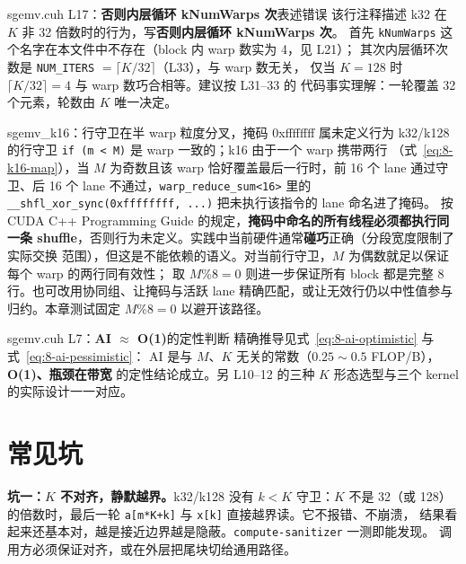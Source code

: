 \begin{kaogu}[F3]{sgemv.cuh L17：\textbf{否则内层循环 kNumWarps 次}表述错误}
  该行注释描述 k32 在 $K$ 非 32 倍数时的行为，写\textbf{否则内层循环 kNumWarps 次}。
  首先 \texttt{kNumWarps} 这个名字在本文件中不存在（block 内 warp 数实为 4，见 L21）；
  其次内层循环次数是 \texttt{NUM\_ITERS} $= \lceil K/32 \rceil$（L33），与 warp 数无关，
  仅当 $K = 128$ 时 $\lceil K/32 \rceil = 4$ 与 warp 数巧合相等。建议按 L31--33 的
  代码事实理解：一轮覆盖 32 个元素，轮数由 $K$ 唯一决定。
\end{kaogu}

\begin{kaogu}[F2]{sgemv\_k16：行守卫在半 warp 粒度分叉，掩码 0xffffffff 属未定义行为}
  k32/k128 的行守卫 \texttt{if (m < M)} 是 warp 一致的；k16 由于一个 warp 携带两行
  （式~\ref{eq:8-k16-map}），当 $M$ 为奇数且该 warp 恰好覆盖最后一行时，前 16 个 lane
  通过守卫、后 16 个 lane 不通过，\texttt{warp\_\allowbreak{}reduce\_\allowbreak{}sum\allowbreak{}<16>} 里的
  \texttt{\_\allowbreak{}\_\allowbreak{}shfl\_\allowbreak{}xor\_\allowbreak{}sync\allowbreak{}(0xffffffff,\allowbreak{} .\allowbreak{}.\allowbreak{}.\allowbreak{})} 把未执行该指令的 lane 命名进了掩码。
  按 CUDA C++ Programming Guide 的规定，\textbf{掩码中命名的所有线程必须都执行同一条
  shuffle}，否则行为未定义。实践中当前硬件通常\textbf{碰巧}正确（分段宽度限制了实际交换
  范围），但这是不能依赖的语义。对当前行守卫，$M$ 为偶数就足以保证每个 warp 的两行同有效性；
  取 $M \% 8 = 0$ 则进一步保证所有 block 都是完整 8 行。也可改用协同组、让掩码与活跃 lane
  精确匹配，或让无效行仍以中性值参与归约。本章测试固定 $M \% 8 = 0$ 以避开该路径。
\end{kaogu}

\begin{kaogu}[F3 核校通过]{sgemv.cuh L7：\textbf{AI $\approx$ O(1)}的定性判断}
  精确推导见式~\ref{eq:8-ai-optimistic} 与式~\ref{eq:8-ai-pessimistic}：
  AI 是与 $M$、$K$ 无关的常数（$0.25 \sim 0.5$ FLOP/B），\textbf{O(1)、瓶颈在带宽}
  的定性结论成立。另 L10--12 的三种 $K$ 形态选型与三个 kernel 的实际设计一一对应。
\end{kaogu}

\section{常见坑}

\textbf{坑一：$K$ 不对齐，静默越界。}\allowbreak{}k32/k128 没有 $k < K$ 守卫：$K$ 不是 32（或 128）
的倍数时，最后一轮 \texttt{a[m*K+k]} 与 \texttt{x[k]} 直接越界读。它不报错、不崩溃，
结果看起来还基本对，越是接近边界越是隐蔽。\texttt{compute-sanitizer} 一测即能发现。
调用方必须保证对齐，或在外层把尾块切给通用路径。

